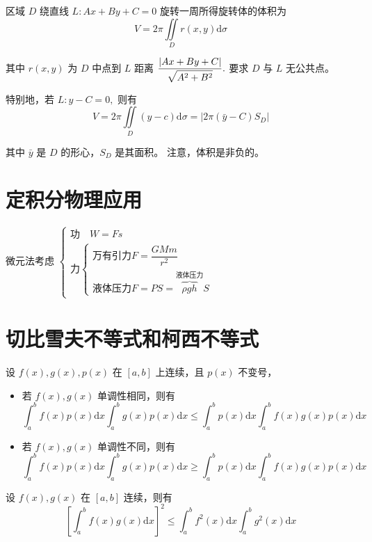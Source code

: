 
区域 $ D $ 绕直线 $ L:Ax+By+C=0 $ 旋转一周所得旋转体的体积为
$$
    V = 2\pi \iint\limits_{D}r(x,y)\mathrm{d}\sigma
$$

其中 $ r(x,y) $ 为 $ D $ 中点到 $ L $ 距离 $ \dfrac{|Ax+By+C|}{\displaystyle\sqrt{A^2+B^2}}. $ 
要求 $ D $ 与 $ L $ 无公共点。

特别地，若 $ L: y-C = 0, $ 则有
$$
    V = 2\pi\iint\limits_D (y-c)\mathrm{d}\sigma = |2\pi(\bar y - C)S_D|
$$

其中 $ \bar y $ 是 $ D $ 的形心，$ S_D $ 是其面积。
注意，体积是非负的。

\section{定积分物理应用}

微元法考虑
$ 
\begin{cases}
    \textrm{功}\quad{} W = Fs \\ 
    \textrm{力}\begin{cases}
        \textrm{万有引力} F = \dfrac{GMm}{r^2}\\ 
        \textrm{液体压力} F = PS = \overbrace{\rho gh}^{\textrm{液体压力}} S 
    \end{cases}
\end{cases} 
$ 

\section{切比雪夫不等式和柯西不等式}


设 $ f(x),g(x),p(x) $ 在 $ [a,b] $ 上连续，且 $ p(x) $ 不变号，
\begin{itemize}
    \item 若 $ f(x),g(x) $ 单调性相同，则有
    $$
        \int_a^bf(x)p(x)\mathrm{d}x\int_a^bg(x)p(x)\mathrm{d}x\leq
        \int_a^bp(x)\mathrm{d}x\int_a^bf(x)g(x)p(x)\mathrm{d}x
    $$
    \item 若 $ f(x),g(x) $ 单调性不同，则有
    $$
        \int_a^bf(x)p(x)\mathrm{d}x\int_a^bg(x)p(x)\mathrm{d}x\geq
        \int_a^bp(x)\mathrm{d}x\int_a^bf(x)g(x)p(x)\mathrm{d}x
    $$
\end{itemize}


设 $ f(x),g(x) $ 在 $ [a,b] $ 连续，则有$$
    \left[\int_a^bf(x)g(x)\mathrm{d}x\right]^2\leq
    \int_a^bf^2(x)\mathrm{d}x\int_a^bg^2(x)\mathrm{d}x
$$